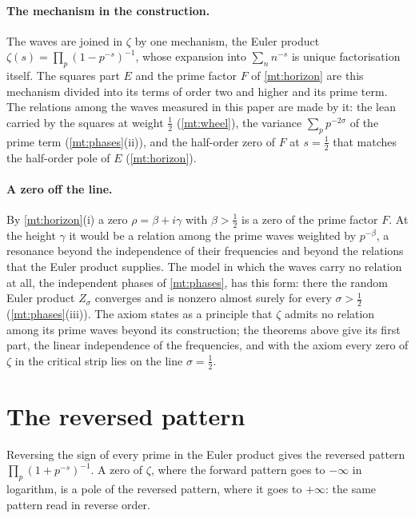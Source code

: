 \documentclass[11pt]{article}
\theoremstyle{definition}\newtheorem{definition}[theorem]{Definition}
\theoremstyle{remark}\newtheorem{remark}[theorem]{Remark}
\theoremstyle{definition}\newtheorem{axiom}{Axiom}
\begin{document}
\paragraph{The mechanism in the construction.} The waves are joined in $\zeta$ by one mechanism, the Euler product $\zeta(s)=\prod_p(1-p^{-s})^{-1}$, whose expansion into $\sum_nn^{-s}$ is unique factorisation itself. The squares part $E$ and the prime factor $F$ of \cref{mt:horizon} are this mechanism divided into its terms of order two and higher and its prime term. The relations among the waves measured in this paper are made by it: the lean carried by the squares at weight $\frac12$ (\cref{mt:wheel}), the variance $\sum_pp^{-2\sigma}$ of the prime term (\cref{mt:phases}(ii)), and the half-order zero of $F$ at $s=\frac12$ that matches the half-order pole of $E$ (\cref{mt:horizon}).

\paragraph{A zero off the line.} By \cref{mt:horizon}(i) a zero $\rho=\beta+i\gamma$ with $\beta>\frac12$ is a zero of the prime factor $F$. At the height $\gamma$ it would be a relation among the prime waves weighted by $p^{-\beta}$, a resonance beyond the independence of their frequencies and beyond the relations that the Euler product supplies. The model in which the waves carry no relation at all, the independent phases of \cref{mt:phases}, has this form: there the random Euler product $Z_\sigma$ converges and is nonzero almost surely for every $\sigma>\frac12$ (\cref{mt:phases}(iii)). The axiom states as a principle that $\zeta$ admits no relation among its prime waves beyond its construction; the theorems above give its first part, the linear independence of the frequencies, and with the axiom every zero of $\zeta$ in the critical strip lies on the line $\sigma=\frac12$.

\section{The reversed pattern}\label{sec:reverse}

Reversing the sign of every prime in the Euler product gives the reversed pattern $\prod_p(1+p^{-s})^{-1}$. A zero of $\zeta$, where the forward pattern goes to $-\infty$ in logarithm, is a pole of the reversed pattern, where it goes to $+\infty$: the same pattern read in reverse order.
\end{document}

